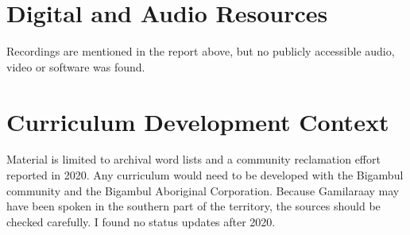 \documentclass[12pt]{article}
\begin{document}
\section{Digital and Audio Resources}
Recordings are mentioned in the report above, but no publicly accessible audio, video or software was found.

\section{Curriculum Development Context}
Material is limited to archival word lists and a community reclamation effort reported in 2020. Any curriculum would need to be developed with the Bigambul community and the Bigambul Aboriginal Corporation. Because Gamilaraay may have been spoken in the southern part of the territory, the sources should be checked carefully. I found no status updates after 2020.
\end{document}
